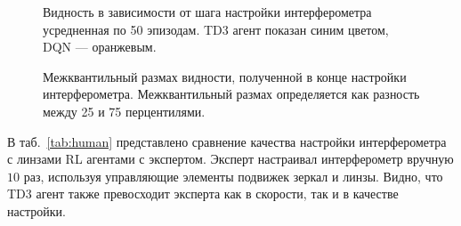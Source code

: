 \begin{figure}[ht]
    \caption{Видность в зависимости от шага настройки интерферометра усредненная по 50 эпизодам.  TD3 агент показан синим цветом, DQN --- оранжевым.}
    \label{fig:results_a}
\end{figure}

\begin{figure}[ht]
\caption{Межквантильный размах видности, полученной в конце настройки интерферометра. Межквантильный размах определяется как разность между 25 и 75 перцентилями.}
    \label{fig:results_b}
\end{figure}

В таб.~\ref{tab:human} представлено сравнение качества настройки интерферометра с линзами RL агентами с экспертом. Эксперт настраивал интерферометр вручную $10$ раз, используя управляющие элементы подвижек зеркал и линзы. Видно, что TD3 агент также превосходит эксперта как в скорости, так и в качестве настройки.

